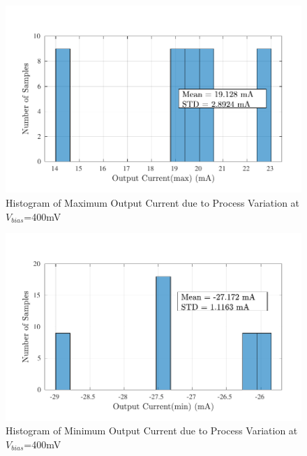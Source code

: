 \begin{figure} [H]
\centering
\includegraphics[scale=1]{Figures/Corners/Overall/Proc_Mid/PDFs/Proc_Mid_imax.pdf}
\caption{Histogram of Maximum Output Current due to Process Variation at $V_{bias}$=400mV}
\end{figure}

\begin{figure} [H]
\centering
\includegraphics[scale=1]{Figures/Corners/Overall/Proc_Mid/PDFs/Proc_Mid_imin.pdf}
\caption{Histogram of Minimum Output Current due to Process Variation at $V_{bias}$=400mV}
\end{figure}

